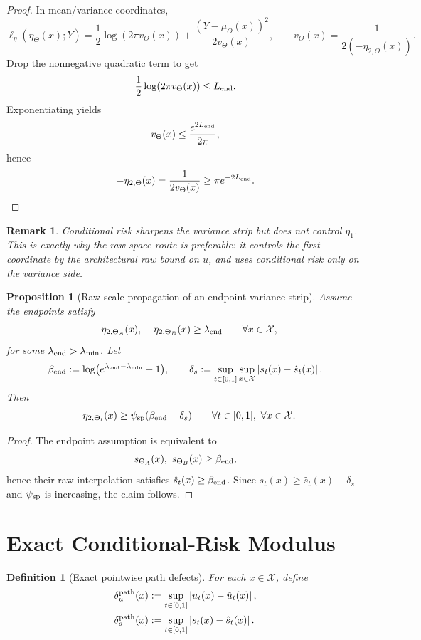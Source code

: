 \documentclass[11pt]{article}
\newtheorem{proposition}{Proposition}
\newtheorem{remark}{Remark}
\newtheorem{definition}{Definition}
\newcommand{\abs}[1]{\left\lvert #1 \right\rvert}
\begin{document}
\begin{proof}
In mean/variance coordinates,
\[
  \ell_\eta(\eta_\Theta(x);Y)
  =
  \frac12\log(2\pi v_\Theta(x))
  +
  \frac{(Y-\mu_\Theta(x))^2}{2v_\Theta(x)},
  \qquad
  v_\Theta(x)=\frac{1}{2(-\eta_{2,\Theta}(x))}.
\]
Drop the nonnegative quadratic term to get
\[
  \frac12\log(2\pi v_\Theta(x))\le L_{\rm end}.
\]
Exponentiating yields
\[
  v_\Theta(x)\le \frac{e^{2L_{\rm end}}}{2\pi},
\]
hence
\[
  -\eta_{2,\Theta}(x)=\frac{1}{2v_\Theta(x)}\ge \pi e^{-2L_{\rm end}}.
\]
\end{proof}

\begin{remark}
Conditional risk sharpens the variance strip but does not control
$\eta_1$. This is exactly why the raw-space route is preferable: it controls
the first coordinate by the architectural raw bound on $u$, and uses
conditional risk only on the variance side.
\end{remark}

\begin{proposition}[Raw-scale propagation of an endpoint variance strip]
\label{prop:raw-scale-strip-propagation}
Assume the endpoints satisfy
\[
  -\eta_{2,\Theta_A}(x),\ -\eta_{2,\Theta_B}(x)\ge \lambda_{\rm end}
  \qquad
  \forall x\in\mathcal X,
\]
for some $\lambda_{\rm end}>\lambda_{\min}$. Let
\[
  \beta_{\rm end}:=\log\bigl(e^{\lambda_{\rm end}-\lambda_{\min}}-1\bigr),
  \qquad
  \delta_s:=\sup_{t\in[0,1]}\sup_{x\in\mathcal X}\abs{s_t(x)-\hat s_t(x)}.
\]
Then
\[
  -\eta_{2,\Theta_t}(x)\ge \psi_{\rm sp}(\beta_{\rm end}-\delta_s)
  \qquad
  \forall t\in[0,1],\ \forall x\in\mathcal X.
\]
\end{proposition}

\begin{proof}
The endpoint assumption is equivalent to
\[
  s_{\Theta_A}(x),\ s_{\Theta_B}(x)\ge \beta_{\rm end},
\]
hence their raw interpolation satisfies $\hat s_t(x)\ge \beta_{\rm end}$. Since
$s_t(x)\ge \hat s_t(x)-\delta_s$ and $\psi_{\rm sp}$ is increasing, the claim
follows.
\end{proof}

\section{Exact Conditional-Risk Modulus}

\begin{definition}[Exact pointwise path defects]
\label{def:exact-pointwise-path-defects}
For each $x\in\mathcal X$, define
\begin{align}
  \delta_u^{\rm path}(x)
  &:=
  \sup_{t\in[0,1]}\abs{u_t(x)-\hat u_t(x)},
  \label{eq:delta-u-path}
  \\
  \delta_s^{\rm path}(x)
  &:=
  \sup_{t\in[0,1]}\abs{s_t(x)-\hat s_t(x)}.
  \label{eq:delta-s-path}
\end{align}
\end{definition}
\end{document}
